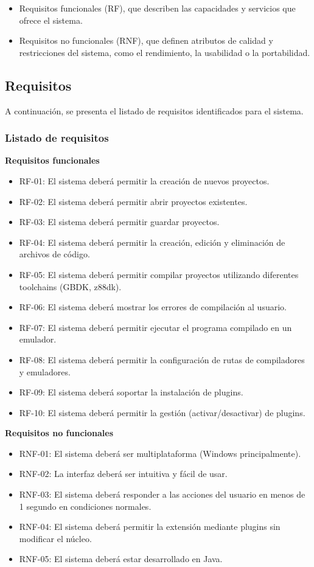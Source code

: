 \documentclass[../../main.tex]{subfiles}
\begin{document}
\begin{itemize}
    \item Requisitos funcionales (RF), que describen las capacidades y servicios que ofrece el sistema.
    \item Requisitos no funcionales (RNF), que definen atributos de calidad y restricciones del sistema, como el rendimiento, la usabilidad o la portabilidad.
\end{itemize}

\subsection{Requisitos}

A continuación, se presenta el listado de requisitos identificados para el sistema.

\subsubsection{Listado de requisitos}

\textbf{Requisitos funcionales}
\begin{itemize}
    \item RF-01: El sistema deberá permitir la creación de nuevos proyectos.
    \item RF-02: El sistema deberá permitir abrir proyectos existentes.
    \item RF-03: El sistema deberá permitir guardar proyectos.
    \item RF-04: El sistema deberá permitir la creación, edición y eliminación de archivos de código.
    \item RF-05: El sistema deberá permitir compilar proyectos utilizando diferentes toolchains (GBDK, z88dk).
    \item RF-06: El sistema deberá mostrar los errores de compilación al usuario.
    \item RF-07: El sistema deberá permitir ejecutar el programa compilado en un emulador.
    \item RF-08: El sistema deberá permitir la configuración de rutas de compiladores y emuladores.
    \item RF-09: El sistema deberá soportar la instalación de plugins.
    \item RF-10: El sistema deberá permitir la gestión (activar/desactivar) de plugins.
\end{itemize}

\clearpage

\textbf{Requisitos no funcionales}
\begin{itemize}
    \item RNF-01: El sistema deberá ser multiplataforma (Windows principalmente).
    \item RNF-02: La interfaz deberá ser intuitiva y fácil de usar.
    \item RNF-03: El sistema deberá responder a las acciones del usuario en menos de 1 segundo en condiciones normales.
    \item RNF-04: El sistema deberá permitir la extensión mediante plugins sin modificar el núcleo.
    \item RNF-05: El sistema deberá estar desarrollado en Java.
\end{itemize}
\end{document}
